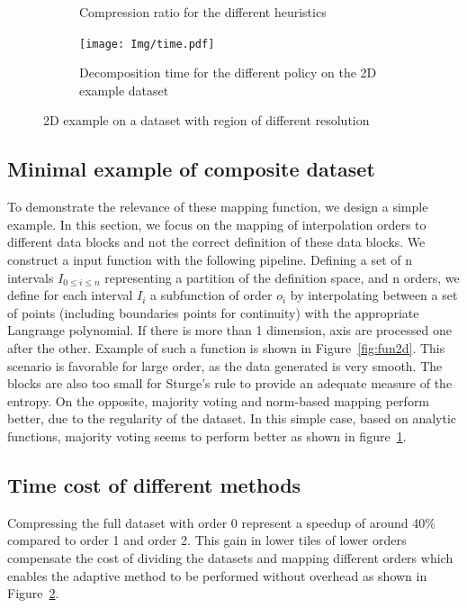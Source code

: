 \documentclass[conference]{IEEEtran}
\theoremstyle{remark}
\begin{document}
\begin{figure}[h]
\begin{subfigure}[b]{0.33\linewidth}
    \caption{\centering Compression ratio for the different heuristics}
    \label{fig:cr2d}
\end{subfigure}
\begin{subfigure}[b]{0.33\linewidth}
    \centering
    \texttt{[image: Img/time.pdf]}
    \caption{\centering Decomposition time for the different policy on the 2D example dataset}
    \label{fig:time}
\end{subfigure}
\caption{2D example on a dataset with region of different resolution}
\label{fig:ex2d}
\end{figure}


\subsection{Minimal example of composite dataset} 
To demonstrate the relevance of these mapping function, we design a simple example. 
In this section, we focus on the mapping of interpolation orders to different data blocks and not the correct definition of these data blocks.
We construct a input function with the following pipeline.
Defining a set of n intervals $I_{0\leq i \leq n}$ representing a partition of the definition space, and n orders, we define for each interval $I_{i}$ a subfunction of order $o_i$ by interpolating between a set of points (including boundaries points for continuity) with the appropriate Langrange polynomial.
If there is more than 1 dimension, axis are processed one after the other. Example of such a function is shown in Figure~\ref{fig:fun2d}.
This scenario is favorable for large order, as the data generated is very smooth.
The blocks are also too small for Sturge's rule to provide an adequate measure of the entropy. On the opposite, majority voting and norm-based mapping perform better, due to the regularity of the dataset.
In this simple case, based on analytic functions, majority voting seems to perform better as shown in figure~\ref{fig:cr2d}.

\subsection{Time cost of different methods}
Compressing the full dataset with order 0 represent a speedup of around 40\% compared to order 1 and order 2. This gain in lower tiles of lower orders compensate the cost of dividing the datasets and mapping different orders which enables the adaptive method to be performed without overhead as shown in Figure~\ref{fig:time}.
\end{document}
